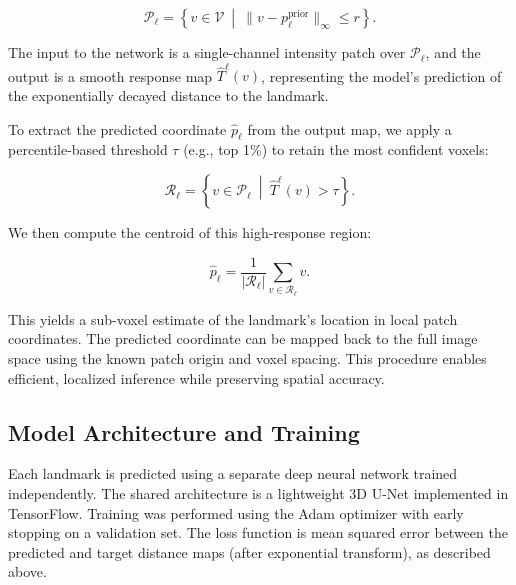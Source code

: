 \begin{equation}
\mathcal{P}_\ell = \left\{ v \in \mathcal{V} \ \middle|\ \lVert v - p_\ell^{\text{prior}} \rVert_\infty \leq r \right\}.
\end{equation}

The input to the network is a single-channel intensity patch over $\mathcal{P}_\ell$, and the output is a smooth response map $\hat{T}^\ell(v)$, representing the model's prediction of the exponentially decayed distance to the landmark.

To extract the predicted coordinate $\hat{p}_\ell$ from the output map, we apply a percentile-based threshold $\tau$ (e.g., top 1\%) to retain the most confident voxels:

\begin{equation}
\mathcal{R}_\ell = \left\{ v \in \mathcal{P}_\ell \ \middle|\ \hat{T}^\ell(v) > \tau \right\}.
\end{equation}

We then compute the centroid of this high-response region:

\begin{equation}
\hat{p}_\ell = \frac{1}{|\mathcal{R}_\ell|} \sum_{v \in \mathcal{R}_\ell} v.
\end{equation}

This yields a sub-voxel estimate of the landmark's location in local patch coordinates. The predicted coordinate can be mapped back to the full image space using the known patch origin and voxel spacing. This procedure enables efficient, localized inference while preserving spatial accuracy.

\subsection{Model Architecture and Training}

Each landmark is predicted using a separate deep neural network trained independently. The shared architecture is a lightweight 3D U-Net implemented in TensorFlow. Training was performed using the Adam optimizer with early stopping on a validation set. The loss function is mean squared error between the predicted and target distance maps (after exponential transform), as described above.

